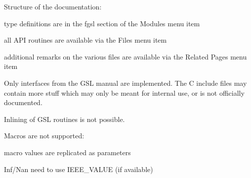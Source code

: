 \begin{DoxyEnumerate}
\begin{DoxyItemize}
\end{DoxyItemize}
\item Structure of the documentation\+: 
\begin{DoxyItemize}
\item type definitions are in the fgsl section of the Modules menu item 
\item all A\+P\+I routines are available via the Files menu item 
\item additional remarks on the various files are available via the Related Pages menu item 
\end{DoxyItemize}
\item Only interfaces from the G\+S\+L manual are implemented. The C include files may contain more stuff which may only be meant for internal use, or is not officially documented. 
\item Inlining of G\+S\+L routines is not possible. 
\item Macros are not supported\+: 
\begin{DoxyItemize}
\item macro values are replicated as parameters 
\item Inf/\+Nan need to use I\+E\+E\+E\+\_\+\+V\+A\+L\+U\+E (if available) 
\end{DoxyItemize}
\end{DoxyEnumerate}